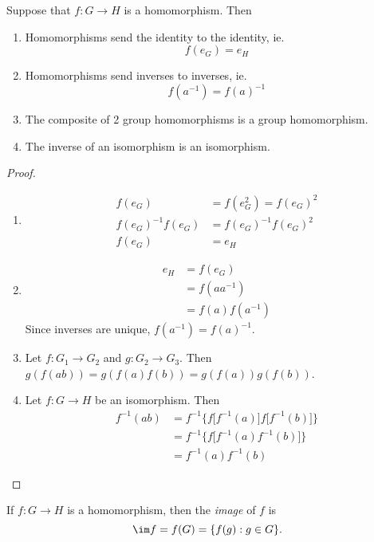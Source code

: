 \documentclass[a4paper]{article}
\begin{document}
\begin{prop}
  Suppose that $f: G\rightarrow H$ is a homomorphism. Then
  \begin{enumerate}
    \item Homomorphisms send the identity to the identity, ie.
      \[
        f(e_G) = e_H
      \]
    \item Homomorphisms send inverses to inverses, ie.
      \[
        f(a^{-1}) = f(a)^{-1}
      \]
    \item The composite of 2 group homomorphisms is a group homomorphism.
    \item The inverse of an isomorphism is an isomorphism.
  \end{enumerate}
\end{prop}
\begin{proof}\leavevmode
  \begin{enumerate}
    \item \begin{align*}
        f(e_G) &= f(e_G^2) = f(e_G)^2\\
        f(e_G)^{-1}f(e_G) &= f(e_G)^{-1}f(e_G)^2\\
        f(e_G) &= e_H
      \end{align*}
    \item
      \begin{align*}
        e_H &= f(e_G)\\
        &= f(aa^{-1})\\
        &= f(a)f(a^{-1})
      \end{align*}
      Since inverses are unique, $f(a^{-1}) = f(a)^{-1}$.
    \item Let $f:G_1 \rightarrow G_2$ and $g:G_2 \rightarrow G_3$. Then $g(f(ab)) = g(f(a)f(b)) = g(f(a))g(f(b))$.
    \item Let $f:G \rightarrow H$ be an isomorphism. Then
      \begin{align*}
        f^{-1}(ab) &= f^{-1}\Big\{f\big[f^{-1}(a)\big]f\big[f^{-1}(b)\big]\Big\}\\
        &= f^{-1}\Big\{f\big[f^{-1}(a)f^{-1}(b)\big]\Big\}\\
        &= f^{-1}(a)f^{-1}(b)
      \end{align*}
  \end{enumerate}
\end{proof}

\begin{defi}
  If $f:G\rightarrow H$ is a homomorphism, then the \emph{image} of $f$ is
  \[
    \im f = f(G) = \{f(g):g\in G\}.
  \]
\end{defi}
\end{document}
